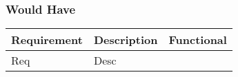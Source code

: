 \documentclass[requirements.tex]{subfiles}
\begin{document}
\subsubsection{Would Have} %
\label{ssub:after_would_have}
\begin{table}[H]
\small
\begin{tabularx}{\textwidth}{| l | X | l |}
 \hline
 \textbf{Requirement} & \textbf{Description} & \textbf{Functional} \\
 \hline
 Req & Desc & \\
 \hline
\end{tabularx}
\end{table}
\end{document}
